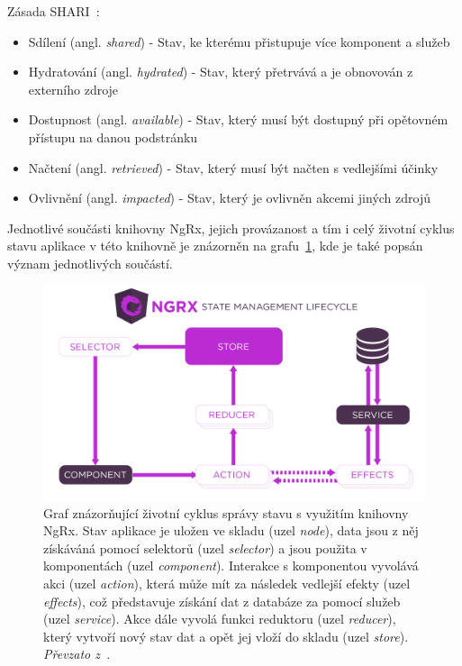 Zásada SHARI~\cite{bib:ng-conf}:
\begin{itemize}
  \item Sdílení (angl. \emph{shared}) - Stav, ke kterému přistupuje více komponent a služeb
  \item Hydratování (angl. \emph{hydrated}) - Stav, který přetrvává a je obnovován z externího zdroje
  \item Dostupnost (angl. \emph{available}) - Stav, který musí být dostupný při opětovném přístupu na danou podstránku
  \item Načtení (angl. \emph{retrieved}) - Stav, který musí být načten s vedlejšími účinky
  \item Ovlivnění (angl. \emph{impacted}) - Stav, který je ovlivněn akcemi jiných zdrojů 
\end{itemize}

Jednotlivé součásti knihovny NgRx, jejich provázanost a tím i celý životní cyklus stavu aplikace v této knihovně je znázorněn na grafu~\ref{img:ngrx-graph}, kde je také popsán význam jednotlivých součástí.

\begin{figure}[H]
	\centering
	\label{img:ngrx-graph}
	\includegraphics[width=\textwidth]{obrazky-figures/ngrx-lifecycle.png}
	\caption{Graf znázorňující životní cyklus správy stavu s využitím knihovny NgRx. Stav aplikace je uložen ve skladu (uzel \emph{node}), data jsou z něj získáváná pomocí selektorů (uzel \emph{selector}) a jsou použita v komponentách (uzel \emph{component}). Interakce s komponentou vyvolává akci (uzel \emph{action}), která může mít za následek vedlejší efekty (uzel \emph{effects}), což představuje získání dat z databáze za pomocí služeb (uzel \emph{service}). Akce dále vyvolá funkci reduktoru (uzel \emph{reducer}), který vytvoří nový stav dat a opět jej vloží do skladu (uzel \emph{store}).  \emph{Převzato z~\cite{bib:ngrx-lifecycle}}.}
\end{figure}

